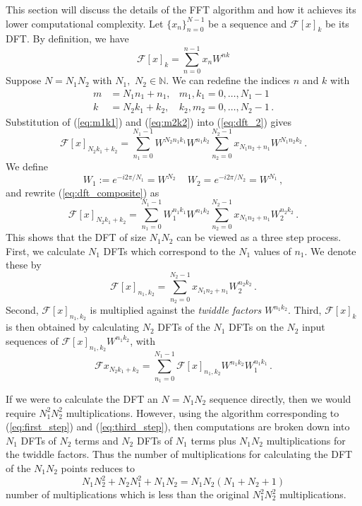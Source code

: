 \documentclass[12pt]{CSUNthesis}
\def\calF{\mathcal{F}}
\begin{document}
This section will discuss the details of the FFT algorithm and how it achieves its lower computational complexity. Let $\{x_n\}_{n=0}^{N-1}$ be a sequence and $\calF[x]_k$ be its DFT. By definition, we have
\begin{equation}
\label{eq:dft_2}
\calF[x]_k = \sum_{n=0}^{n-1} x_n W^{nk}
\end{equation}
Suppose $N=N_1 N_2$ with $N_1,$ $N_2 \in \mathbb{N}$. We can redefine the indices $n$ and $k$ with 
\begin{align}
\label{eq:m1k1}
m &= N_1 n_1 + n_1 , & m_1 , k_1 = 0, \dots, N_1-1 \\
\label{eq:m2k2}
k &= N_2 k_1 + k_2 , & k_2 , m_2 = 0, \dots, N_2-1 \, .
\end{align}
Substitution of (\ref{eq:m1k1}) and (\ref{eq:m2k2}) into (\ref{eq:dft_2}) gives 
\begin{equation}
\label{eq:dft_composite}
\calF[x]_{N_2k_1 + k_2} = \sum_{n_1=0}^{N_1-1} W^{N_2n_1k_1}W^{n_1k_2} \sum_{n_2=0}^{N_2-1} x_{N_1 n_2+ n_1} W^{N_1 n_2k_2} \, .
\end{equation}
We define
\begin{equation*}
W_1 := e^{-i 2 \pi / N_1} = W^{N_2}\, \quad W_2 = e^{-i 2 \pi / N_2} = W^{N_1}\, ,
\end{equation*}
and rewrite (\ref{eq:dft_composite}) as
\begin{equation}
\label{eq:first_step}
\calF[x]_{N_2k_1 + k_2} = \sum_{n_1=0}^{N_1-1} W_1^{n_1k_1}W^{n_1k_2} \sum_{n_2=0}^{N_2-1} x_{N_1n_2+n_1} W_2^{n_2k_2} \, .
\end{equation}
This shows that the DFT of size $N_1N_2$ can be viewed as a three step process. First, we calculate $N_1$ DFTs which correspond to the $N_1$ values of $n_1$. We denote these by 
\begin{equation}
\calF[x]_{n_1,k_2} = \sum_{n_2=0}^{N_2-1} x_{N_1n_2+n_1} W_2^{n_2k_2} \, .
\end{equation}
Second, $\calF[x]_{n_1,k_2}$ is multiplied against the \textit{twiddle factors} $W^{n_1k_2}$. Third, $\calF[x]_k$ is then obtained by calculating $N_2$ DFTs of the $N_1$ DFTs on the $N_2$ input sequences of $\calF[x]_{n_1,k_2}W^{n_1k_2}$, with
\begin{equation}
\label{eq:third_step}
\calF{x}_{N_2k_1+k_2} = \sum_{n_1=0}^{N_1-1}\calF[x]_{n_1,k_2}W^{n_1 k_2}W_1^{n_1k_1} \, .
\end{equation}

If we were to calculate the DFT an $N=N_1N_2$ sequence directly, then we would require $N_1^2N_2^2$ multiplications. However, using the algorithm corresponding to (\ref{eq:first_step}) and (\ref{eq:third_step}), then computations are broken down into $N_1$ DFTs of $N_2$ terms and $N_2$ DFTs of $N_1$ terms plus $N_1N_2$ multiplications for the twiddle factors. Thus the number of multiplications for calculating the DFT of the $N_1N_2$ points reduces to
\begin{equation*}
N_1N_2^2 + N_2N_1^2 + N_1N_2 = N_1N_2(N_1+N_2+1)
\end{equation*}
number of multiplications which is less than the original $N_1^2N_2^2$ multiplications.
\end{document}
